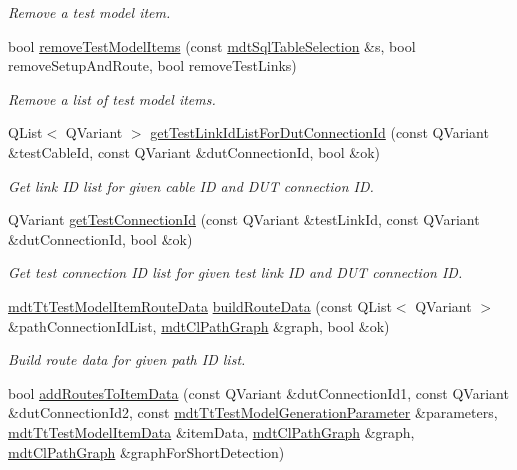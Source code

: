 \begin{DoxyCompactItemize}
\begin{DoxyCompactList}\small\item\em Remove a test model item. \end{DoxyCompactList}\item 
bool \hyperlink{classmdt_tt_test_model_a9306ae820be056e338ca965803e64297}{remove\-Test\-Model\-Items} (const \hyperlink{classmdt_sql_table_selection}{mdt\-Sql\-Table\-Selection} \&s, bool remove\-Setup\-And\-Route, bool remove\-Test\-Links)
\begin{DoxyCompactList}\small\item\em Remove a list of test model items. \end{DoxyCompactList}\item 
Q\-List$<$ Q\-Variant $>$ \hyperlink{classmdt_tt_test_model_a9c1e48f268abfdfd13d6a2aea470c282}{get\-Test\-Link\-Id\-List\-For\-Dut\-Connection\-Id} (const Q\-Variant \&test\-Cable\-Id, const Q\-Variant \&dut\-Connection\-Id, bool \&ok)
\begin{DoxyCompactList}\small\item\em Get link I\-D list for given cable I\-D and D\-U\-T connection I\-D. \end{DoxyCompactList}\item 
Q\-Variant \hyperlink{classmdt_tt_test_model_adf5c4348225d07bb25981b022f65f1ed}{get\-Test\-Connection\-Id} (const Q\-Variant \&test\-Link\-Id, const Q\-Variant \&dut\-Connection\-Id, bool \&ok)
\begin{DoxyCompactList}\small\item\em Get test connection I\-D list for given test link I\-D and D\-U\-T connection I\-D. \end{DoxyCompactList}\item 
\hyperlink{classmdt_tt_test_model_item_route_data}{mdt\-Tt\-Test\-Model\-Item\-Route\-Data} \hyperlink{classmdt_tt_test_model_aa049741d69df67ef6abb9f56521fbe43}{build\-Route\-Data} (const Q\-List$<$ Q\-Variant $>$ \&path\-Connection\-Id\-List, \hyperlink{classmdt_cl_path_graph}{mdt\-Cl\-Path\-Graph} \&graph, bool \&ok)
\begin{DoxyCompactList}\small\item\em Build route data for given path I\-D list. \end{DoxyCompactList}\item 
bool \hyperlink{classmdt_tt_test_model_ab687b1a66cf03bd1a12ed1051fafa5d5}{add\-Routes\-To\-Item\-Data} (const Q\-Variant \&dut\-Connection\-Id1, const Q\-Variant \&dut\-Connection\-Id2, const \hyperlink{structmdt_tt_test_model_generation_parameter}{mdt\-Tt\-Test\-Model\-Generation\-Parameter} \&parameters, \hyperlink{classmdt_tt_test_model_item_data}{mdt\-Tt\-Test\-Model\-Item\-Data} \&item\-Data, \hyperlink{classmdt_cl_path_graph}{mdt\-Cl\-Path\-Graph} \&graph, \hyperlink{classmdt_cl_path_graph}{mdt\-Cl\-Path\-Graph} \&graph\-For\-Short\-Detection)

\end{DoxyCompactItemize}
